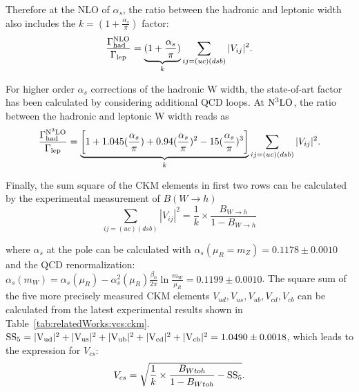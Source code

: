 \noindent Therefore at the NLO of $\alpha_s$, the ratio between the hadronic and leptonic \PW width also includes the $k=(1+\frac{\alpha_s}{\pi})$ factor:
\begin{equation}
    \frac{\Gamma_{\rm had}^{\rm NLO}}{\Gamma_{\rm lep}} =  \underbrace{(1+\frac{\alpha_s}{\pi})}_{k} \sum_{ij=(uc)(dsb)} |V_{ij}|^2.
\end{equation}


\noindent For higher order $\alpha_s$ corrections of the hadronic W width, the state-of-art factor has been calculated by considering additional QCD loops. At $\rm N^3LO$, the ratio between the hadronic and leptonic W width reads as 
\begin{equation}
    \frac{\Gamma_{\rm had}^{\rm N^3LO}}{\Gamma_{\rm lep}} =   \underbrace{ \bigg [ 1+1.045 ( \frac{\alpha_s}{\pi} ) + 0.94  ( \frac{\alpha_s}{\pi} ) ^2 -15  ( \frac{\alpha_s}{\pi} ) ^3 \bigg ]}_{k} \sum_{ij=(uc)(dsb)} |V_{ij}|^2.
\end{equation}

\noindent Finally, the sum square of the CKM elements in first two rows can be calculated by the experimental measurement of $B(W \to h)$
\begin{equation}
    \sum_{ij=(uc)(dsb)} |V_{ij}|^2 = \frac{1}{k}\times \frac{B_{W \to h} }{1- B_{W \to h}}
\end{equation}



\noindent where $\alpha_s$ at the \PW pole can be calculated with $\alpha_s(\mu_R = m_Z)=0.1178\pm0.0010$~\cite{pdg2020} and the QCD renormalization: $\alpha_s(m_W) = \alpha_s(\mu_R) - \alpha^2_s(\mu_R) \frac{ \beta_0}{2\pi} \ln \frac{m_W}{\mu_R} = 0.1199 \pm 0.0010$. The square sum of the five more precisely measured CKM elements $V_{ud},V_{us},V_{ub},V_{cd},V_{cb}$ can be calculated from the latest experimental results \cite{pdg2020} shown in Table~\ref{tab:relatedWorks:vcs:ckm}. $\rm{SS_5} = |V_{ud}|^2 + |V_{us}|^2 + |V_{ub}|^2 + |V_{cd}|^2 + |V_{cb}|^2 = 1.0490 \pm 0.0018$, which leads to the expression for $V_{cs}$:
\begin{equation}
V_{cs} = \sqrt{ \frac{1}{k}\times \frac{B_{W \to h} }{1- B_{W \to h}} - \rm{SS_5} } .
\end{equation}



